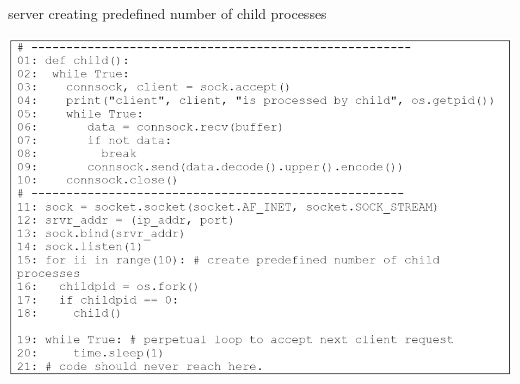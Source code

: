 \begin{table}[H]

\vspace{-.3cm}

\centering
\caption{server creating predefined number of child processes}\label{tab11}
\includegraphics[scale=2.35]{src/Figures/chap1/tab11.jpg}
\end{table}


